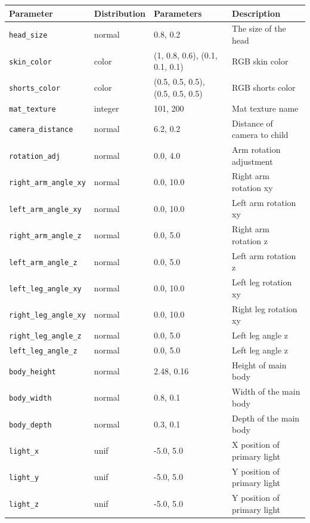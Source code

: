 \documentclass{article}
\begin{document}
\begin{table}[h]
    \centering
    {\scriptsize
    \begin{tabular}{|l|l|l|l|}
    \hline
    \textbf{Parameter} & \textbf{Distribution} & \textbf{Parameters} & \textbf{Description} \\ 
    \hline
    \texttt{head\_size} & normal & 0.8, 0.2 & The size of the head\\ 
    \texttt{skin\_color} & color & (1, 0.8, 0.6), (0.1, 0.1, 0.1) & RGB skin color\\ 
    \texttt{shorts\_color} & color & (0.5, 0.5, 0.5), (0.5, 0.5, 0.5) & RGB shorts color \\ 
    \texttt{mat\_texture} & integer & 101, 200 & Mat texture name \\ 
    \texttt{camera\_distance} & normal & 6.2, 0.2 & Distance of camera to child \\ 
    \texttt{rotation\_adj} & normal & 0.0, 4.0 &  Arm rotation adjustment\\ 
    \texttt{right\_arm\_angle\_xy} & normal & 0.0, 10.0 &  Right arm rotation xy\\ 
    \texttt{left\_arm\_angle\_xy} & normal & 0.0, 10.0 &  Left arm rotation xy\\ 
    \texttt{right\_arm\_angle\_z} & normal & 0.0, 5.0 &  Right arm rotation z\\ 
    \texttt{left\_arm\_angle\_z} & normal & 0.0, 5.0 &  Left arm rotation z\\ 
    \texttt{left\_leg\_angle\_xy} & normal & 0.0, 10.0 & Left leg rotation xy  \\ 
    \texttt{right\_leg\_angle\_xy} & normal & 0.0, 10.0 & Right leg rotation xy  \\ 
    \texttt{right\_leg\_angle\_z} & normal & 0.0, 5.0 &  Left leg angle z\\
    \texttt{left\_leg\_angle\_z} & normal & 0.0, 5.0 &  Left leg angle z\\ 
    \texttt{body\_height} & normal & 2.48, 0.16 & Height of main body \\ 
    \texttt{body\_width} & normal & 0.8, 0.1 & Width of the main body \\
    \texttt{body\_depth} & normal & 0.3, 0.1 & Depth of the main body \\
    \texttt{light\_x} & unif & -5.0, 5.0 & X position of primary light  \\ 
    \texttt{light\_y} & unif & -5.0, 5.0 & Y position of primary light \\ 
    \texttt{light\_z} & unif & -5.0, 5.0 & Y position of primary light \\ 

\end{tabular}}
\end{table}
\end{document}
